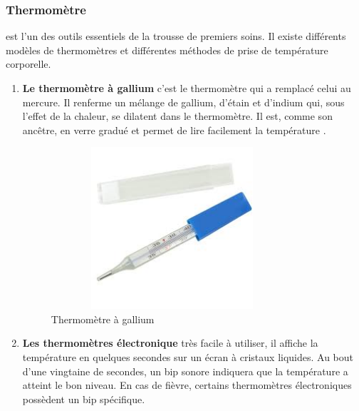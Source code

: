\documentclass[12pt]{article}
\begin{document}
\subsubsection{Thermomètre}
est l’un des outils essentiels de la trousse de premiers soins. Il existe différents modèles de thermomètres et différentes méthodes de prise de température corporelle.
\begin{enumerate}
	\item \textbf{Le thermomètre à gallium} c’est le thermomètre qui a remplacé celui au mercure. Il renferme un mélange de gallium, d’étain et d’indium qui, sous l’effet de la chaleur, se dilatent dans le thermomètre. Il est, comme son ancêtre, en verre gradué et permet de lire facilement la température \cite{36}.
	\begin{figure}[h]
		\centering
		\includegraphics[height=6cm,width=9cm]{img-Chapiter-2/galune.jpeg}
		\caption{Thermomètre à gallium}
		\label{fig:gallium}
	\end{figure}
	\newpage
	\item \textbf{Les thermomètres électronique} très facile à utiliser, il affiche la température en quelques secondes sur un écran à cristaux liquides. Au bout d’une vingtaine de secondes, un bip sonore indiquera que la température a atteint le bon niveau. En cas de fièvre, certains thermomètres électroniques possèdent un bip spécifique. 
	

\end{enumerate}
\end{document}
